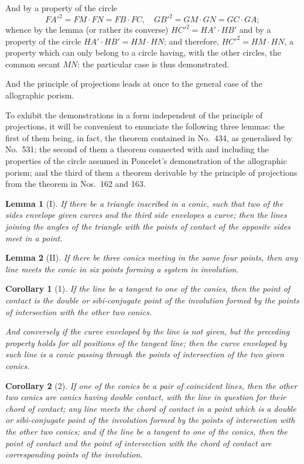 \documentclass[12pt,a4paper]{article}
\theoremstyle{plain}
\newtheorem{lemma}{Lemma}
\newtheorem{corollary}{Corollary}
\theoremstyle{definition}
\begin{document}
And by a property of the circle
\[
FA'^2 = FM \cdot FN = FB \cdot FC, \quad GB'^2 = GM \cdot GN = GC \cdot GA;
\]
whence by the lemma (or rather its converse) $HC'^2 = HA' \cdot HB'$ and by a property of the circle $HA' \cdot HB' = HM \cdot HN$; and therefore, $HC'^2 = HM \cdot HN$, a property which can only belong to a circle having, with the other circles, the common secant $MN$: the particular case is thus demonstrated.

And the principle of projections leads at once to the general case of the allographic porism.

To exhibit the demonstrations in a form independent of the principle of projections, it will be convenient to enunciate the following three lemmas: the first of them being, in fact, the theorem contained in No.~434, as generalised by No.~531; the second of them a theorem connected with and including the properties of the circle assumed in Poncelet's demonstration of the allographic porism; and the third of them a theorem derivable by the principle of projections from the theorem in Nos.~162 and 163.

\begin{lemma}[I]
If there be a triangle inscribed in a conic, such that two of the sides envelope given curves and the third side envelopes a curve; then the lines joining the angles of the triangle with the points of contact of the opposite sides meet in a point.
\end{lemma}

\begin{lemma}[II]
If there be three conics meeting in the same four points, then any line meets the conic in six points forming a system in involution.
\end{lemma}

\begin{corollary}[1]
If the line be a tangent to one of the conies, then the point of contact is the double or sibi-conjugate point of the involution formed by the points of intersection with the other two conics.

And conversely if the curve enveloped by the line is not given, but the preceding property holds for all positions of the tangent line; then the curve enveloped by such line is a conic passing through the points of intersection of the two given conics.
\end{corollary}

\begin{corollary}[2]
If one of the conics be a pair of coincident lines, then the other two conics are conics having double contact, with the line in question for their chord of contact; any line meets the chord of contact in a point which is a double or sibi-conjugate point of the involution formed by the points of intersection with the other two conics; and if the line be a tangent to one of the conics, then the point of contact and the point of intersection with the chord of contact are corresponding points of the involution.
\end{corollary}
\end{document}

